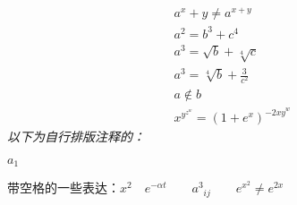 \documentclass{article}
\begin{document}
{
    \begin{eqnarray}
        a^x+y\neq a^{x+y} \\
        a^2 = b^3 + c^4 \\
        a^3 = \sqrt{b} + \sqrt[4]{c} \\
        a^3 = \sqrt[4]{b} + \frac{3}{c^2} \\
        a\notin b \\%
        x^{y^{z^w}} = (1+e^x)^{{-2xy}^w} %
    \end{eqnarray}
    \emph{以下为自行排版注释的：}
    \begin{center}
        $a_1$
    \end{center}
    带空格的一些表达：\quad$x^2 \quad e^{-\alpha t} \qquad{a^3}_{ij}\qquad e^{x^2} \neq e^{2x}$ \\
}
    
\end{document}
